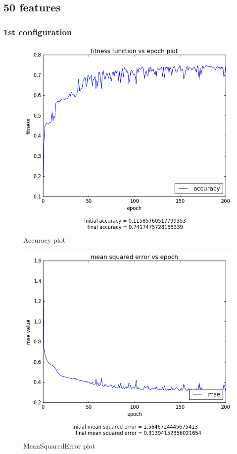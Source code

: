 \documentclass[12pt,a4paper]{article}
\begin{document}
\subsection{50 features}
\subsubsection{1st configuration}
\begin{figure}[H]
\centering
\includegraphics[scale=0.4]{img/50_acc.png}
\caption{Accuracy plot}
\end{figure}
\begin{figure}[H]
\centering
\includegraphics[scale=0.4]{img/50_mse.png}
\caption{MeanSquaredError plot}
\end{figure}
\end{document}
